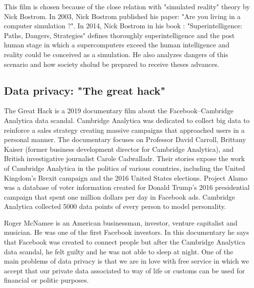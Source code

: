  This film is chosen because of the close relation with  "simulated reality" theory by Nick Bostrom.
 In 2003, Nick Bostrom published his paper: "Are you living in a computer simulation ?".
 In 2014, Nick Bostrom in his book : "Superintelligence: Paths, Dangers, Strategies" 
 defines thoroughly superintelligence and the post human stage in which a supercomputers exceed the human intelligence and reality could be 
 conceived as a simulation. He also analyzes dangers of this scenario and 
 how society sholud be prepared to receive theses advances. 
 
 
 
    
  
   
        \subsection*{Data privacy: "The great hack"}
 The Great Hack is a 2019 documentary film about the Facebook–Cambridge Analytica data scandal.
 Cambridge Analytica was dedicated to collect big data to reinforce a  sales strategy creating massive campaigns that approached users in a 
 personal manner.
 The documentary focuses on Professor David Carroll, Brittany Kaiser (former business development director for Cambridge Analytica), and 
 British investigative journalist Carole Cadwalladr. Their stories expose the work of Cambridge Analytica in the politics of various 
 countries, including the United Kingdom's Brexit campaign and the 2016 United States elections.   
 Project Alamo was a database of voter information created for Donald Trump's 2016 presidential campaign
 that spent one million dollars per day in Facebook ads. 
 Cambridge Analytica collected 5000 data points of every person to model personality.   
  
 Roger McNamee is an American businessman, investor, venture capitalist and musician.
 He was one of the first Facebook investors. In this documentary he says that 
 Facebook was created to connect people but after the Cambridge Analytica data scandal, he felt guilty and 
 he was not able to sleep at night. 
 One of the main problems of data privacy is that we are in love with free service in which   we accept 
 that our private data associated to way of life or customs can be used for financial or politic purposes. 
 
